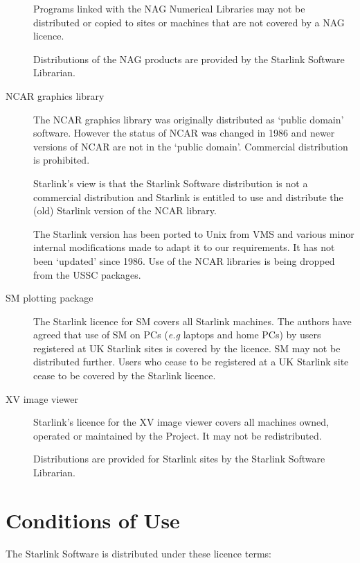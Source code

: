 \documentclass[twoside,11pt]{article}
\newcommand{\xlabel}[1]{}
\renewcommand{\_}{\texttt{\symbol{95}}}
\begin{document}
\begin{description}
Programs linked with the NAG Numerical Libraries may not be distributed
or copied to sites or machines that are not covered by a NAG licence.

Distributions of the NAG products are provided by the Starlink Software
Librarian.

\item[NCAR graphics library]\mbox{}

The NCAR graphics library was originally distributed as `public domain'
software.  However the status of NCAR was changed in 1986 and newer
versions of NCAR are not in the `public domain'.  Commercial distribution
is prohibited.

Starlink's view is that the Starlink Software distribution is not a
commercial distribution and Starlink is entitled to use and distribute
the (old) Starlink version of the NCAR library.

The Starlink version has been ported to Unix from VMS and various minor
internal modifications made to adapt it to our requirements.  It has not
been `updated' since 1986.  Use of the NCAR libraries is being dropped
from the USSC packages.

\item[SM plotting package]\mbox{}

The Starlink licence for SM covers all Starlink machines.  The authors
have agreed that use of SM on PCs (\emph{e.g} laptops and home PCs) by
users registered at UK Starlink sites is covered by the licence.  SM
may not be distributed further.  Users who cease to be registered at a
UK Starlink site cease to be covered by the Starlink licence.


\item[XV image viewer]\mbox{}

Starlink's licence for the XV image viewer covers all machines owned,
operated or maintained by the Project.  It may not be redistributed.

Distributions are provided for Starlink sites by the Starlink Software
Librarian.

\end{description}

\newpage
\appendix

\section{\xlabel{conditions_of_use}Conditions of Use}
\label{conditions_of_use}

The Starlink Software is distributed under these licence terms:
\end{document}
